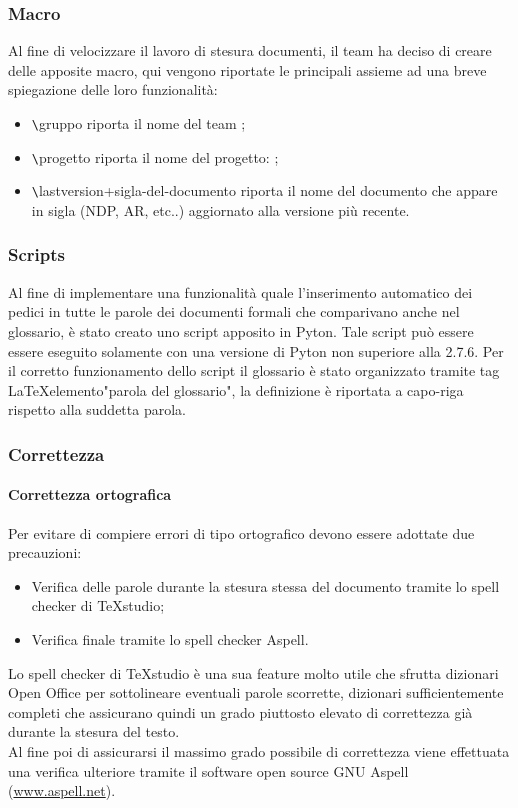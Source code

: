 \subsubsection{Macro}
Al fine di velocizzare il lavoro di stesura documenti, il team \gruppo{} ha deciso di creare delle apposite macro, qui vengono riportate le principali assieme ad una breve spiegazione delle loro funzionalità:
\begin{itemize}
\item \verb+\+gruppo riporta il nome del team \gruppo;
\item \verb+\+progetto riporta il nome del progetto: \progetto;
\item \verb+\+lastversion+sigla-del-documento riporta il nome del documento che appare in sigla (NDP, AR, etc..) aggiornato alla versione più recente.

\end{itemize}
\subsubsection{Scripts}
Al fine di implementare una funzionalità quale l'inserimento automatico dei pedici in tutte le parole dei documenti formali che comparivano anche nel glossario, è stato creato uno script apposito in Pyton. Tale script può essere essere eseguito solamente con una versione di Pyton non superiore alla 2.7.6.
Per il corretto funzionamento dello script il glossario è stato organizzato tramite tag \LaTeX elemento{"parola del glossario"}, la definizione è riportata a capo-riga rispetto alla suddetta parola. 

\subsubsection{Correttezza}
\paragraph{Correttezza ortografica}
Per evitare di compiere errori di tipo ortografico devono essere adottate due precauzioni:
\begin{itemize}
\item Verifica delle parole durante la stesura stessa del documento tramite lo spell checker di TeXstudio;
\item Verifica finale tramite lo spell checker Aspell.
\end{itemize}
Lo spell checker di TeXstudio è una sua feature molto utile che sfrutta dizionari Open Office per sottolineare eventuali parole scorrette, dizionari sufficientemente completi che assicurano quindi un grado piuttosto elevato di correttezza già durante la stesura del testo. \\
Al fine poi di assicurarsi il massimo grado possibile di correttezza viene effettuata una verifica ulteriore tramite il software open source GNU Aspell
(\href{http://www.aspell.net/}{www.aspell.net}).
 
